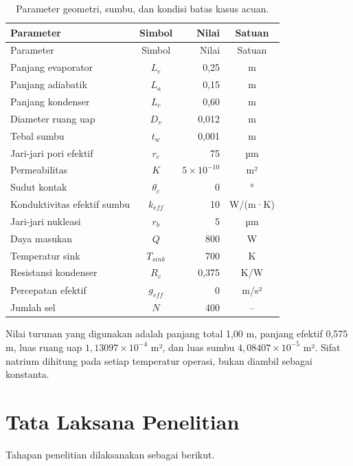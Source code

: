 \documentclass[
  12pt,
  12pt,a4paper,oneside]{report}
\begin{document}
\begin{longtable}[]{@{}lcrc@{}}
\caption{Parameter geometri, sumbu, dan kondisi batas kasus
acuan.}\tabularnewline
\toprule
Parameter & Simbol & Nilai & Satuan \\
\midrule
\endfirsthead
\toprule
Parameter & Simbol & Nilai & Satuan \\
\midrule
\endhead
Panjang evaporator & \(L_e\) & 0,25 & m \\
Panjang adiabatik & \(L_a\) & 0,15 & m \\
Panjang kondenser & \(L_c\) & 0,60 & m \\
Diameter ruang uap & \(D_v\) & 0,012 & m \\
Tebal sumbu & \(t_w\) & 0,001 & m \\
Jari-jari pori efektif & \(r_c\) & 75 & µm \\
Permeabilitas & \(K\) & \(5\times10^{-10}\) & m² \\
Sudut kontak & \(\theta_c\) & 0 & ° \\
Konduktivitas efektif sumbu & \(k_{eff}\) & 10 & W/(m·K) \\
Jari-jari nukleasi & \(r_b\) & 5 & µm \\
Daya masukan & \(Q\) & 800 & W \\
Temperatur sink & \(T_{sink}\) & 700 & K \\
Resistansi kondenser & \(R_c\) & 0,375 & K/W \\
Percepatan efektif & \(g_{eff}\) & 0 & m/s² \\
Jumlah sel & \(N\) & 400 & -- \\
\bottomrule
\end{longtable}

Nilai turunan yang digunakan adalah panjang total 1,00 m, panjang
efektif 0,575 m, luas ruang uap \(1{,}13097\times10^{-4}\) m², dan luas
sumbu \(4{,}08407\times10^{-5}\) m². Sifat natrium dihitung pada setiap
temperatur operasi, bukan diambil sebagai konstanta.

\hypertarget{tata-laksana-penelitian}{%
\section{Tata Laksana Penelitian}\label{tata-laksana-penelitian}}

Tahapan penelitian dilaksanakan sebagai berikut.
\end{document}
